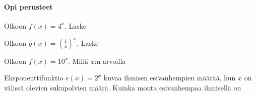 \begin{tehtavasivu}

\paragraph*{Opi perusteet}

\begin{tehtava}
Olkoon $f(x) = 4^x$. Laske
\begin{alakohdat}
\end{alakohdat}
\begin{vastaus}
\begin{alakohdat}
\end{alakohdat}
\end{vastaus}
\end{tehtava}

\begin{tehtava}
Olkoon $g(x) = (\frac{1}{4})^x$. Laske
\begin{alakohdat}
\end{alakohdat}
\begin{vastaus}
\begin{alakohdat}
\end{alakohdat}
\end{vastaus}
\end{tehtava}

\begin{tehtava}
Olkoon $f(x) = 10^x$. Millä $x$:n arvoilla
\begin{alakohdat}
\end{alakohdat}
\begin{vastaus}
\begin{alakohdat}
\end{alakohdat}
\end{vastaus}
\end{tehtava}

\begin{tehtava}
Eksponenttifunktio $ e(x)=2^{x}$ kuvaa ihmisen esivanhempien määrää, kun $ x $ on välissä olevien sukupolvien määrä. Kuinka monta esivanhempaa ihmisellä on
\begin{alakohdat}
\end{alakohdat} 
\begin{vastaus}
\begin{alakohdat}
\end{alakohdat} 
\end{vastaus}
\end{tehtava}


\end{tehtavasivu}
